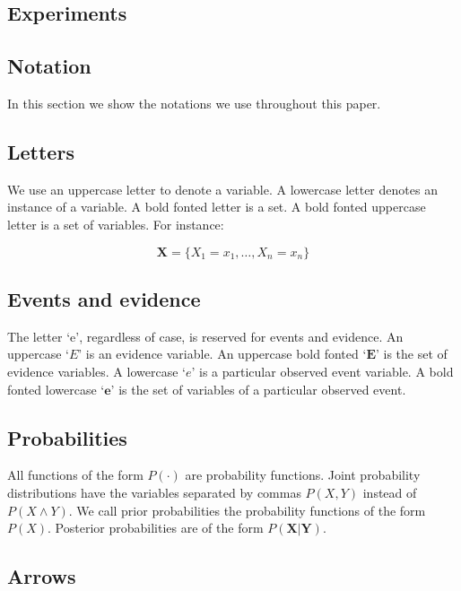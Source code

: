 \documentclass[a4paper,10pt]{article}
\theoremstyle{plain}
\begin{document}
\subsection{Experiments}

\newpage
\begin{appendices}
\section{Notation}\label{app:not}

In this section we show the notations we use throughout this paper.

\subsection{Letters}

We use an uppercase letter to denote a variable. A lowercase letter denotes an instance of a
variable. A bold fonted letter is a set. A bold fonted uppercase letter is a set of variables. For
instance:

\begin{equation*}
  \mathbf{X}=\{X_1=x_1,\ldots,X_n=x_n\}
\end{equation*}

\subsection{Events and evidence}

The letter `e', regardless of case, is reserved for events and evidence. An uppercase `$E$' is an
evidence variable. An uppercase bold fonted `$\mathbf{E}$' is the set of evidence variables. A
lowercase `$e$' is a particular observed event variable. A bold fonted lowercase `$\mathbf{e}$' is
the set of variables of a particular observed event.

\subsection{Probabilities}

All functions of the form $P(\cdot)$ are probability functions. Joint probability distributions
have the variables separated by commas $P(X,Y)$ instead of $P(X \wedge Y)$. We call prior
probabilities the probability functions of the form $P(X)$. Posterior probabilities are of the form
$P(\mathbf{X}|\mathbf{Y})$.

\subsection{Arrows}


\end{appendices}
\end{document}
